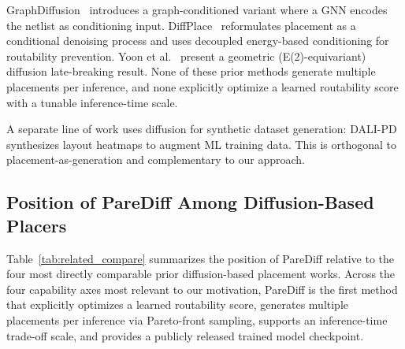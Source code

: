 \documentclass[lettersize,journal]{IEEEtran}
\begin{document}
GraphDiffusion~\cite{fang2025graphdiffusion} introduces a graph-conditioned variant where a GNN encodes the netlist as conditioning input. DiffPlace~\cite{trung2025diffplace} reformulates placement as a conditional denoising process and uses decoupled energy-based conditioning for routability prevention. Yoon et al.~\cite{yoon2025geometric} present a geometric (E(2)-equivariant) diffusion late-breaking result. None of these prior methods generate multiple placements per inference, and none explicitly optimize a learned routability score with a tunable inference-time scale.

A separate line of work uses diffusion for synthetic dataset generation: DALI-PD~\cite{wu2025dalipd} synthesizes layout heatmaps to augment ML training data. This is orthogonal to placement-as-generation and complementary to our approach.

\subsection{Position of PareDiff Among Diffusion-Based Placers}

Table~\ref{tab:related_compare} summarizes the position of PareDiff relative to the four most directly comparable prior diffusion-based placement works. Across the four capability axes most relevant to our motivation, PareDiff is the first method that explicitly optimizes a learned routability score, generates multiple placements per inference via Pareto-front sampling, supports an inference-time trade-off scale, and provides a publicly released trained model checkpoint.
\end{document}
